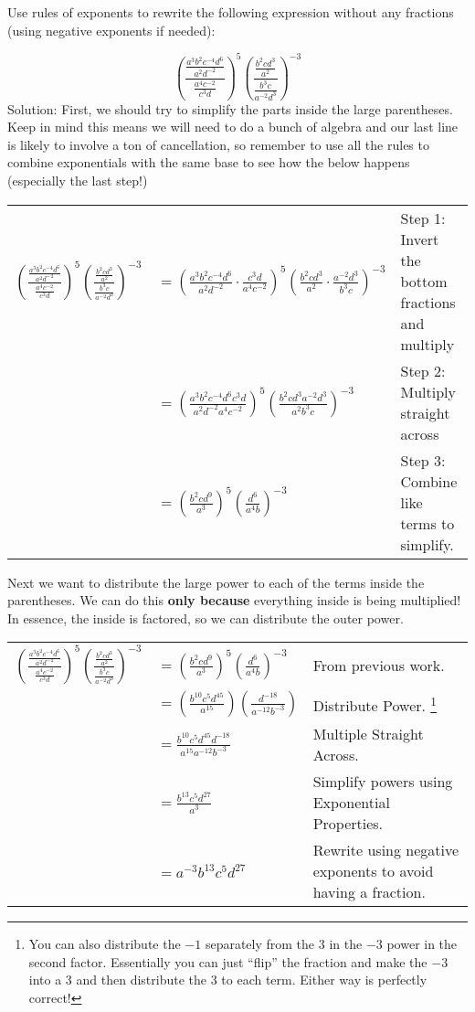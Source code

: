 \documentclass{ximera}
\begin{document}
\begin{example}
Use rules of exponents to rewrite the following expression without any fractions (using negative exponents if needed):

\[
    \left(\frac{\frac{a^3b^2c^{-4}d^6}{a^2d^{-2}}}{\frac{a^4c^{-2}}{c^3d}}\right)^5
        \left(\frac{\frac{b^2cd^3}{a^2}}{\frac{b^3c}{a^{-2}d^3}}\right)^{-3}
\]
Solution: First, we should try to simplify the parts inside the large parentheses. Keep in mind this means we will need to do a bunch of algebra and our last line is likely to involve a ton of cancellation, so remember to use all the rules to combine exponentials with the same base to see how the below happens (especially the last step!)\\

\begin{tabular}{rll}
    $\left(\frac{\frac{a^3b^2c^{-4}d^6}{a^2d^{-2}}}{\frac{a^4c^{-2}}{c^3d}}\right)^5
        \left(\frac{\frac{b^2cd^3}{a^2}}{\frac{b^3c}{a^{-2}d^3}}\right)^{-3}$ 
        & $=\left(\frac{a^3b^2c^{-4}d^6}{a^2d^{-2}}\cdot\frac{c^3d}{a^4c^{-2}}\right)^5
            \left(\frac{b^2cd^3}{a^2}\cdot\frac{a^{-2}d^3}{b^3c}\right)^{-3}$ 
            & Step 1: Invert the bottom fractions and multiply \\
        & $= \left(\frac{a^3b^2c^{-4}d^6c^3d}{a^2d^{-2}a^4c^{-2}}\right)^5
            \left(\frac{b^2cd^3a^{-2}d^3}{a^2b^3c}\right)^{-3}$
            & Step 2: Multiply straight across\\
        & $= \left(\frac{b^2cd^9}{a^3}\right)^5
            \left(\frac{d^6}{a^4b}\right)^{-3}$
            & Step 3: Combine like terms to simplify.
\end{tabular}

Next we want to distribute the large power to each of the terms inside the parentheses. We can do this \textbf{only because} everything inside is being multiplied! In essence, the inside is factored, so we can distribute the outer power.
\renewcommand{\arraystretch}{2.5}
\begin{tabular}{rll}
    $\left(\frac{\frac{a^3b^2c^{-4}d^6}{a^2d^{-2}}}{\frac{a^4c^{-2}}{c^3d}}\right)^5
        \left(\frac{\frac{b^2cd^3}{a^2}}{\frac{b^3c}{a^{-2}d^3}}\right)^{-3}$ 
    & $= \left(\frac{b^2cd^9}{a^3}\right)^5
        \left(\frac{d^6}{a^4b}\right)^{-3}$
        & From previous work.\\
    & $= \left(\frac{b^{10}c^5d^{45}}{a^{15}}\right)
        \left(\frac{d^{-18}}{a^{-12}b^{-3}}\right)$
        & Distribute Power.
        \footnote{You can also distribute the $-1$ separately from the $3$ in the $-3$ power in the second factor. Essentially you can just ``flip'' the fraction and make the $-3$ into a $3$ and then distribute the $3$ to each term. Either way is perfectly correct!}\\
    & $= \frac{b^{10}c^5d^{45}d^{-18}}{a^{15}a^{-12}b^{-3}}$
        & Multiple Straight Across.\\
    & $= \frac{b^{13}c^5d^{27}}{a^3}$
        & Simplify powers using Exponential Properties.\\
    & $= a^{-3}b^{13}c^5d^{27}$
        & Rewrite using negative exponents to avoid having a fraction.
        

\end{tabular}
\end{example}
\end{document}
